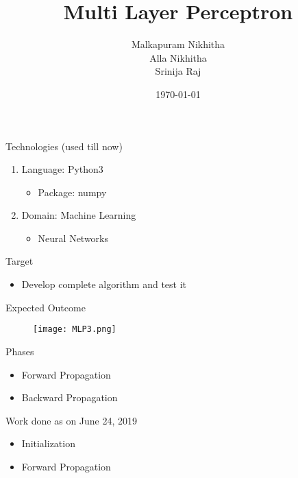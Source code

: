 \documentclass{beamer}
\title{Multi Layer Perceptron }
\author{ Malkapuram Nikhitha \\ Alla Nikhitha \\ Srinija Raj}
\institute[WE]{ TalentSprint - WE program }
\date{\today}
\begin{document}
\begin{frame}
  \titlepage
\end{frame}

\begin{frame}{Technologies (used till now) }
    \begin{enumerate}
        \item Language: Python3
        \begin{itemize}
             \vspace{10pt}
                \item Package: numpy
        \end{itemize}
        \vspace{20pt}
        \item  Domain: Machine Learning
            \vspace{10pt}
            \begin{itemize}
                \item Neural Networks
               
            \end{itemize}
    \end{enumerate}
\end{frame}

\begin{frame}{Target}
\begin{itemize}
  \item Develop complete algorithm and test it 
\end{itemize}
\end{frame}

\begin{frame}{Expected Outcome}
\begin{figure}
    \texttt{[image: MLP3.png]}
\end{figure}
\end{frame}
    
\begin{frame}{Phases}
    \begin{itemize}
        \item Forward Propagation
        \vspace{20pt}
        \item Backward Propagation
    \end{itemize}
\end{frame}
    
\begin{frame}{Work done as on June 24, 2019}
    \begin{itemize}
        \item Initialization
        \vspace{20pt}
        \item Forward Propagation
    \end{itemize}
\end{frame}
\end{document}
